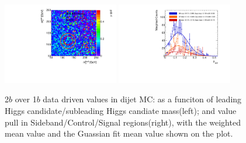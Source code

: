 \begin{figure}[htbp!]
\begin{center}
\includegraphics[angle=270, width=0.45\textwidth]{./figures/boosted/AppendixMuqcdstudy/QCD_TwoTag_Incl_mH0H1.pdf}
\includegraphics[angle=270, width=0.45\textwidth]{./figures/boosted/AppendixMuqcdstudy/QCD_TwoTag_Incl_mH0H1_pull.pdf}
\caption{2$b$ over 1$b$ data driven \muqcd values in dijet MC: \muqcd as a funciton of leading Higgs candidate/subleading Higgs candiate mass(left); and \muqcd value pull in Sideband/Control/Signal regions(right), with the weighted mean value and the Guassian fit mean value shown on the plot.}
\label{fig:app-muqcd-2b-qcd}
\end{center}
\end{figure}

